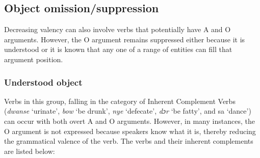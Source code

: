\documentclass[output=paper]{langsci/langscibook}
\begin{document}
\subsection{Object omission/suppression}\label{§4.5:object.osam}

Decreasing valency can also involve verbs that potentially have A and O arguments. However, the O argument remains suppressed either because it is understood or it is known that any one of a range of entities can fill that argument position.

\subsubsection{Understood object}\label{§4.5.1:understood.osam}

Verbs in this group, falling in the category of Inherent Complement Verbs (\textit{dwanse} `urinate', \textit{bow} `be drunk', \textit{nye} `defecate', \textit{dɔr} `be fatty', and sa `dance') can occur with both overt A and O arguments. However, in many instances, the O argument is not expressed because speakers know what it is, thereby reducing the grammatical valence of the verb. The verbs and their inherent complements are listed below:

\ea
\label{ex:37.osam}
	\z

	\z

	\z

	\z

	\z
\z


\ea
\label{ex:38.osam}
	\z
\end{document}

